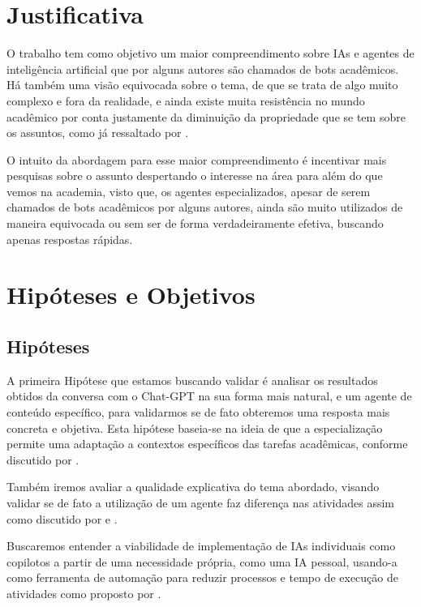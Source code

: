 \documentclass{article}
\begin{document}
\section{Justificativa}

\hspace{0.5cm}O trabalho tem como objetivo um maior compreendimento sobre IAs e agentes de inteligência artificial que por alguns autores são chamados de bots acadêmicos. Há também uma visão equivocada sobre o tema, de que se trata de algo muito complexo e fora da realidade, e ainda existe muita resistência no mundo acadêmico por conta justamente da diminuição da propriedade que se tem sobre os assuntos, como já ressaltado por \cite{Sampaio2024}.

O intuito da abordagem para esse maior compreendimento é incentivar mais pesquisas sobre o assunto despertando o interesse na área para além do que vemos na academia, visto que, os agentes especializados, apesar de serem chamados de bots acadêmicos por alguns autores, ainda são muito utilizados de maneira equivocada ou sem ser de forma verdadeiramente efetiva, buscando apenas respostas rápidas.

\section{ Hipóteses e Objetivos}

\subsection{Hipóteses}

\hspace{0.5cm}A primeira Hipótese que estamos buscando validar é analisar os resultados obtidos da conversa com o Chat-GPT na sua forma mais natural, e um agente de conteúdo específico, para validarmos se de fato obteremos uma resposta mais concreta e objetiva. Esta hipótese baseia-se na ideia de que a especialização permite uma adaptação a contextos específicos das tarefas acadêmicas, conforme discutido por \cite{Sampaio2024}.

Também iremos avaliar a qualidade explicativa do tema abordado, visando validar se de fato a utilização de um agente faz diferença nas atividades assim como discutido por \cite{Mariani2023} e \cite{Sampaio2024}. 

Buscaremos entender a viabilidade de implementação de IAs individuais como copilotos a partir de uma necessidade própria, como uma IA pessoal, usando-a como ferramenta de automação para reduzir processos e tempo de execução de atividades como proposto por \cite{Mariani2023}.
\end{document}
